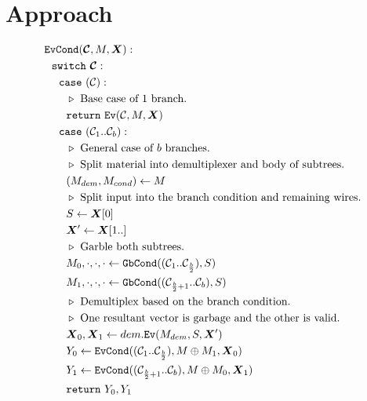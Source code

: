 \section{Approach}\label{sec:approach}


\begin{figure}
  \begin{align*}
    &\evcond(\vec{\cir}, M, \vec{X}):\\
    &~~\switch~\vec{\cir}:\\
    &~~~~\ccase~(\cir):\\
    &~~~~~~\codecomment{Base case of $1$ branch.}\\
    &~~~~~~\creturn~\ev(\cir, M, \vec{X})\\
    &~~~~\ccase~(\cir_1..\cir_b):\\
    &~~~~~~\codecomment{General case of $b$ branches.}\\
    &~~~~~~\codecomment{Split material into demultiplexer and body of subtrees.}\\
    &~~~~~~(M_{dem}, M_{cond}) \gets M\\
    &~~~~~~\codecomment{Split input into the branch condition and remaining wires.}\\
    &~~~~~~S \gets \vec{X}[0]\\
    &~~~~~~\vec{X}' \gets \vec{X}[1..]\\
    &~~~~~~\codecomment{Garble both subtrees.}\\
    &~~~~~~M_0,\cdot,\cdot,\cdot \gets \gbcond((\cir_1..\cir_{\frac{b}{2}}), S)\\
    &~~~~~~M_1,\cdot,\cdot,\cdot \gets \gbcond((\cir_{\frac{b}{2}+1}..\cir_b), S)\\
    &~~~~~~\codecomment{Demultiplex based on the branch condition.}\\
    &~~~~~~\codecomment{One resultant vector is garbage and the other is valid.}\\
    &~~~~~~\vec{X}_0, \vec{X}_1 \gets dem.\ev(M_{dem}, S, \vec{X}')\\
    &~~~~~~Y_0 \gets \evcond((\cir_1..\cir_{\frac{b}{2}}), M \oplus M_1, \vec{X}_0)\\
    &~~~~~~Y_1 \gets \evcond((\cir_{\frac{b}{2}+1}..\cir_b), M \oplus M_0, \vec{X}_1)\\
    &~~~~~~\creturn~Y_0, Y_1
  \end{align*}
\end{figure}
